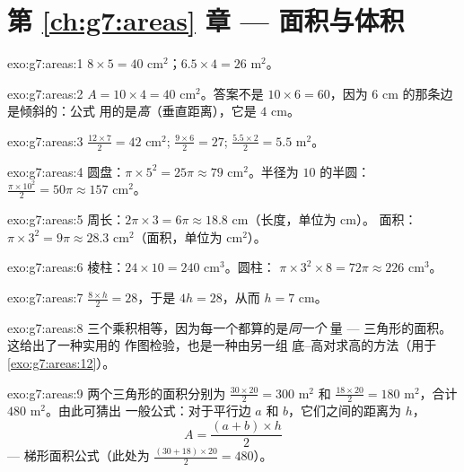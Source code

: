 \section*{第 \ref{ch:g7:areas} 章 --- 面积与体积}

\begin{solution}{exo:g7:areas:1}
$8 \times 5 = 40$ cm$^2$；\qquad $6.5 \times 4 = 26$ m$^2$。
\end{solution}

\begin{solution}{exo:g7:areas:2}
$A = 10 \times 4 = 40$ cm$^2$。答案不是
$10 \times 6 = 60$，因为 $6$ cm 的那条边是倾斜的：公式
用的是\emph{高}（垂直距离），它是 $4$ cm。
\end{solution}

\begin{solution}{exo:g7:areas:3}
$\frac{12 \times 7}{2} = 42$ cm$^2$; \quad
$\frac{9 \times 6}{2} = 27$; \quad
$\frac{5.5 \times 2}{2} = 5.5$ m$^2$。
\end{solution}

\begin{solution}{exo:g7:areas:4}
圆盘：$\pi \times 5^2 = 25\pi \approx 79$ cm$^2$。半径为
$10$ 的半圆：$\frac{\pi \times 10^2}{2} = 50\pi \approx 157$ cm$^2$。
\end{solution}

\begin{solution}{exo:g7:areas:5}
周长：$2\pi \times 3 = 6\pi \approx 18.8$ cm（长度，单位为 cm）。
面积：$\pi \times 3^2 = 9\pi \approx 28.3$ cm$^2$（面积，单位为
cm$^2$）。
\end{solution}

\begin{solution}{exo:g7:areas:6}
棱柱：$24 \times 10 = 240$ cm$^3$。圆柱：
$\pi \times 3^2 \times 8 = 72\pi \approx 226$ cm$^3$。
\end{solution}

\begin{solution}{exo:g7:areas:7}
$\frac{8 \times h}{2} = 28$，于是 $4h = 28$，从而 $h = 7$ cm。
\end{solution}

\begin{solution}{exo:g7:areas:8}
三个乘积相等，因为每一个都算的是\emph{同一个}
量 --- 三角形的面积。这给出了一种实用的
作图检验，也是一种由另一组
底--高对求高的方法（用于\cref{exo:g7:areas:12}）。
\end{solution}

\begin{solution}{exo:g7:areas:9}
两个三角形的面积分别为 $\frac{30 \times 20}{2} = 300$ m$^2$
和 $\frac{18 \times 20}{2} = 180$ m$^2$，合计 $480$ m$^2$。由此可猜出
一般公式：对于平行边 $a$ 和 $b$，它们之间的距离为 $h$，
\[
A = \frac{(a + b) \times h}{2}
\]
--- 梯形面积公式（此处为 $\frac{(30+18)\times 20}{2} = 480$）。
\end{solution}

